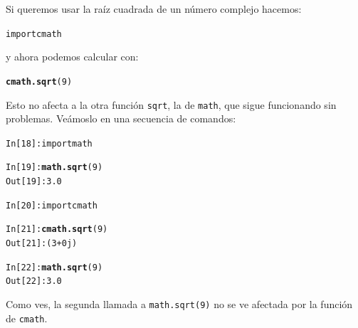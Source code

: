 \documentclass[10pt,a4paper]{article}\usepackage[]{graphicx}\usepackage[]{color}
\makeatletter
\newcommand{\hlnum}[1]{\textcolor[rgb]{0.686,0.059,0.569}{#1}}%
\newcommand{\hlstd}[1]{\textcolor[rgb]{0.345,0.345,0.345}{#1}}%
\newcommand{\hlkwd}[1]{\textcolor[rgb]{0.737,0.353,0.396}{\textbf{#1}}}%
\newenvironment{kframe}{%
 \def\at@end@of@kframe{}%
 \ifinner\ifhmode%
  \def\at@end@of@kframe{\end{minipage}}%
  \begin{minipage}{\columnwidth}%
 \fi\fi%
 \def\FrameCommand##1{\hskip\@totalleftmargin \hskip-\fboxsep
 \colorbox{shadecolor}{##1}\hskip-\fboxsep
     \hskip-\linewidth \hskip-\@totalleftmargin \hskip\columnwidth}%
 \MakeFramed {\advance\hsize-\width
   \@totalleftmargin\z@ \linewidth\hsize
   \@setminipage}}%
 {\par\unskip\endMakeFramed%
 \at@end@of@kframe}
\newenvironment{knitrout}{}{} %
\makeatother
\begin{document}
Si queremos usar la raíz cuadrada de un número complejo hacemos:
\begin{knitrout}
\color{fgcolor}\begin{kframe}
\begin{alltt}
import cmath
\end{alltt}
\end{kframe}
\end{knitrout}
y ahora podemos calcular con:
\begin{knitrout}
\color{fgcolor}\begin{kframe}
\begin{alltt}
\hlkwd{cmath.sqrt}\hlstd{(}\hlnum{9}\hlstd{)}
\end{alltt}
\end{kframe}
\end{knitrout}
Esto no afecta a la otra función {\tt sqrt}, la de {\tt math}, que sigue funcionando sin problemas. Veámoslo en una secuencia de comandos:
\begin{knitrout}
\color{fgcolor}\begin{kframe}
\begin{alltt}
In [18]: import math

In [19]: \hlkwd{math.sqrt}(9)
Out[19]: 3.0

In [20]: import cmath

In [21]: \hlkwd{cmath.sqrt}(9)
Out[21]: (3+0j)

In [22]: \hlkwd{math.sqrt}(9)
Out[22]: 3.0
\end{alltt}
\end{kframe}
\end{knitrout}
Como ves, la segunda llamada a {\tt math.sqrt(9)} no se ve afectada por la función de {\tt cmath}.
\end{document}
